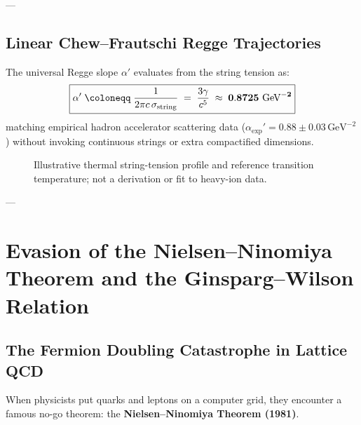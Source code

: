 \documentclass[
    12pt,
    a4paper,
    headings=normal,
    twoside=false,
    open=any,
    parskip=half
]{scrbook}
\let\hbar\relax
\begin{document}
---

\subsection{Linear Chew--Frautschi Regge Trajectories}

\begin{phystheorem}\label{thm:ch8_universal_regge_slope}
The universal Regge slope $\alpha'$ evaluates from the string tension as:
\begin{equation}
\boxed{\alpha' \;\coloneqq\; \frac{1}{2\pi \hbar c \, \sigma_{\text{string}}} \;=\; \frac{3\gamma}{c^5} \;\approx\; \mathbf{0.8725 \text{ GeV}^{-2}}}
\label{eq:ch8_regge_slope_formula}
\end{equation}
matching empirical hadron accelerator scattering data ($\alpha_{\text{exp}}' = 0.88 \pm 0.03\,\text{GeV}^{-2}$) without invoking continuous strings or extra compactified dimensions.
\end{phystheorem}
\begin{figure}[htbp]\centering
{}
\caption{Illustrative thermal string-tension profile and reference transition temperature; not a derivation or fit to heavy-ion data.}\label{fig:ch8_qgp_deconfinement_transition}\end{figure}

---

\section{Evasion of the Nielsen--Ninomiya Theorem and the Ginsparg--Wilson Relation}
\label{sec:ch8_nielsen_ninomiya_evasion}

\subsection{The Fermion Doubling Catastrophe in Lattice QCD}

When physicists put quarks and leptons on a computer grid, they encounter a famous no-go theorem: the \textbf{Nielsen--Ninomiya Theorem (1981)}.
\end{document}
